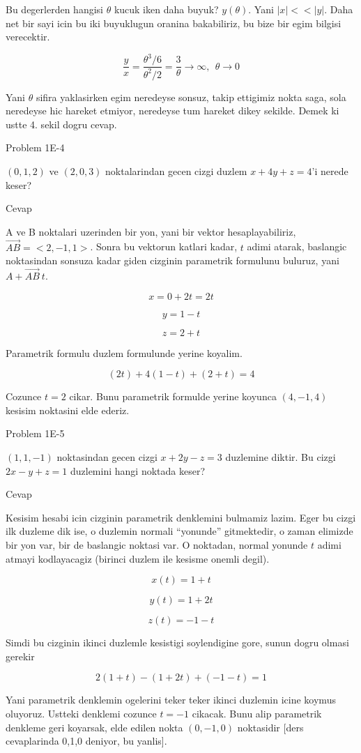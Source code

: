 \documentclass[12pt,fleqn]{article}
\begin{document}
Bu degerlerden hangisi $\theta$ kucuk iken daha buyuk? $y(\theta)$. Yani
$|x| << |y|$. Daha net bir sayi icin bu iki buyuklugun oranina bakabiliriz,
bu bize bir egim bilgisi verecektir. 

\[ \frac{y}{x} = \frac{\theta^3/6}{\theta^2/2 } = 
\frac{3}{\theta} \to \infty, \ \ \theta \to 0
\]

Yani $\theta$ sifira yaklasirken egim neredeyse sonsuz, takip ettigimiz
nokta saga, sola neredeyse hic hareket etmiyor, neredeyse tum hareket dikey
sekilde. Demek ki ustte 4. sekil dogru cevap. 

Problem 1E-4

$(0,1,2)$ ve $(2,0,3)$ noktalarindan gecen cizgi duzlem $x + 4y + z = 4$'i
nerede keser? 

Cevap

A ve B noktalari uzerinden bir yon, yani bir vektor hesaplayabiliriz, 
$\vec{AB}
= <2,-1,1>$. Sonra bu vektorun katlari kadar, $t$ adimi atarak, baslangic
noktasindan sonsuza kadar giden cizginin parametrik formulunu buluruz, yani
$A + \vec{AB} \ t$. 

\[ x = 0 + 2t = 2t \]

\[ y = 1 - t \]

\[ z = 2 + t \]

Parametrik formulu duzlem formulunde yerine koyalim. 

\[ (2t) + 4(1-t) + (2+t) = 4 \]

Cozunce $t=2$ cikar. Bunu parametrik formulde yerine koyunca $(4,-1,4)$
kesisim noktasini elde ederiz. 

Problem 1E-5 

$(1,1,-1)$ noktasindan gecen cizgi $x+2y - z = 3$ duzlemine diktir. Bu
cizgi $2x - y + z = 1$ duzlemini hangi noktada keser? 

Cevap

Kesisim hesabi icin cizginin parametrik denklemini bulmamiz lazim. Eger bu
cizgi ilk duzleme dik ise, o duzlemin normali ``yonunde'' gitmektedir, o
zaman elimizde bir yon var, bir de baslangic noktasi var. O noktadan,
normal yonunde $t$ adimi atmayi kodlayacagiz (birinci duzlem ile kesisme
onemli degil). 

\[ x(t) = 1 + t \]

\[ y(t) = 1 + 2t \]

\[ z(t) = -1 -t \]

Simdi bu cizginin ikinci duzlemle kesistigi soylendigine gore, sunun dogru
olmasi gerekir

\[ 2(1+t) - (1+2t) + (-1-t) = 1 \]

Yani parametrik denklemin ogelerini teker teker ikinci duzlemin icine
koymus oluyoruz. Ustteki denklemi cozunce $t=-1$ cikacak. Bunu alip
parametrik denkleme geri koyarsak, elde edilen nokta $(0,-1,0)$
noktasidir [ders cevaplarinda 0,1,0 deniyor, bu yanlis]. 
\end{document}
